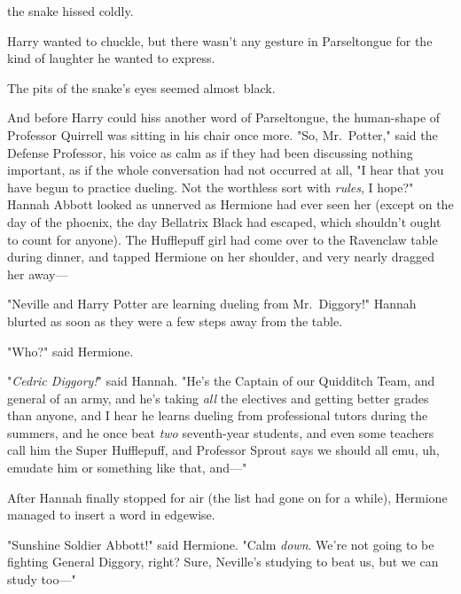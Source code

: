  the snake hissed coldly. 

Harry wanted to chuckle, but there wasn't any gesture in Parseltongue for the
kind of laughter he wanted to express.

The pits of the snake's eyes seemed almost black. 

And before Harry could hiss another word of Parseltongue, the human-shape of
Professor Quirrell was sitting in his chair once more. "So, Mr.~Potter," said
the Defense Professor, his voice as calm as if they had been discussing nothing
important, as if the whole conversation had not occurred at all, "I hear that
you have begun to practice dueling. Not the worthless sort with \emph{rules}, I
hope?"
\sbreak
Hannah Abbott looked as unnerved as Hermione had ever seen her (except on the
day of the phoenix, the day Bellatrix Black had escaped, which shouldn't ought
to count for anyone). The Hufflepuff girl had come over to the Ravenclaw table
during dinner, and tapped Hermione on her shoulder, and very nearly dragged her
away---

"Neville and Harry Potter are learning dueling from Mr.~Diggory!" Hannah
blurted as soon as they were a few steps away from the table.

"Who?" said Hermione.

"\emph{Cedric Diggory!}" said Hannah. "He's the Captain of our Quidditch Team,
and general of an army, and he's taking \emph{all} the electives and getting
better grades than anyone, and I hear he learns dueling from professional
tutors during the summers, and he once beat \emph{two} seventh-year students,
and even some teachers call him the Super Hufflepuff, and Professor Sprout says
we should all emu, uh, emudate him or something like that, and---"

After Hannah finally stopped for air (the list had gone on for a while),
Hermione managed to insert a word in edgewise.

"Sunshine Soldier Abbott!" said Hermione. "Calm \emph{down}. We're not going to
be fighting General Diggory, right? Sure, Neville's studying to beat us, but we
can study too---"

